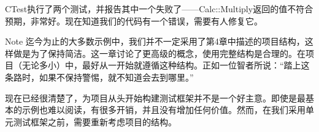 CTest执行了两个测试，并报告其中一个失败了——Calc::Multiply返回的值不符合预期，非常好。现在知道我们的代码有一个错误，需要有人修复它。

\begin{myNotic}{Note}
迄今为止的大多数示例中，我们并不一定采用了第4章中描述的项目结构，这样做是为了保持简洁。这一章讨论了更高级的概念，使用完整结构是合理的。在项目（无论多小）中，最好从一开始就遵循这种结构。正如一位智者所说：“踏上这条路时，如果不保持警惕，就不知道会去到哪里。”
\end{myNotic}

现在已经很清楚了，为项目从头开始构建测试框架并不是一个好主意。即使是最基本的示例也难以阅读，有很多开销，并且没有增加任何价值。然而，在我们采用单元测试框架之前，需要重新考虑项目的结构。






































